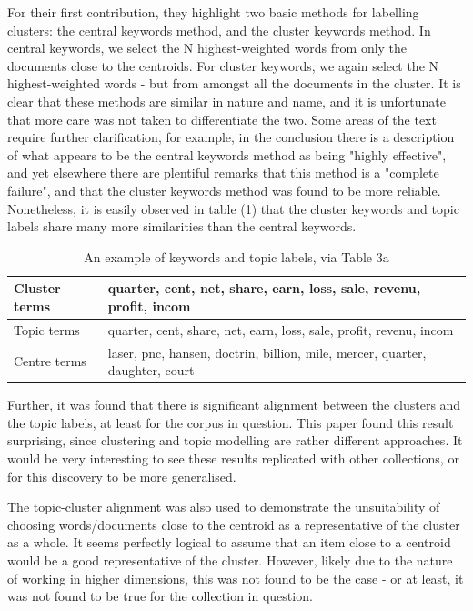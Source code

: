 \documentclass[sigconf,authorversion,nonacm]{acmart}
\begin{document}
For their first contribution, they highlight two basic methods for labelling clusters: the central keywords method, and the cluster keywords method. In central keywords, we select the N highest-weighted words from only the documents close to the centroids. For cluster keywords, we again select the N highest-weighted words - but from amongst all the documents in the cluster. It is clear that these methods are similar in nature and name, and it is unfortunate that more care was not taken to differentiate the two. Some areas of the text require further clarification, for example, in the conclusion there is a description of what appears to be the central keywords method as being "highly effective"\cite{Yuan2021}, and yet elsewhere there are plentiful remarks that this method is a "complete failure"\cite{Yuan2021}, and that the cluster keywords method was found to be more reliable. Nonetheless, it is easily observed in table (1) that the cluster keywords and topic labels share many more similarities than the central keywords.
\begin{table}[]
\begin{tabular}{lp{5cm}}
\hline
Cluster terms & quarter, cent, net, share, earn, loss, sale, revenu, profit, incom \\
\hline
Topic terms  &  quarter, cent, share, net, earn, loss, sale, profit, revenu, incom\\
\hline
Centre terms & laser, pnc, hansen, doctrin, billion, mile, mercer, quarter, daughter, court\\
\hline
\end{tabular}
\caption{An example of keywords and topic labels, via Table 3a \cite{Yuan2021}}
\end{table}
Further, it was found that there is significant alignment between the clusters and the topic labels, at least for the corpus in question. This paper found this result surprising, since clustering and topic modelling are rather different approaches. It would be very interesting to see these results replicated with other collections, or for this discovery to be more generalised.

The topic-cluster alignment was also used to demonstrate the unsuitability of choosing words/documents close to the centroid as a representative of the cluster as a whole. It seems perfectly logical to assume that an item close to a centroid would be a good representative of the cluster. However,  likely due to the nature of working in higher dimensions, this was not found to be the case - or at least, it was not found to be true for the collection in question.
\end{document}
